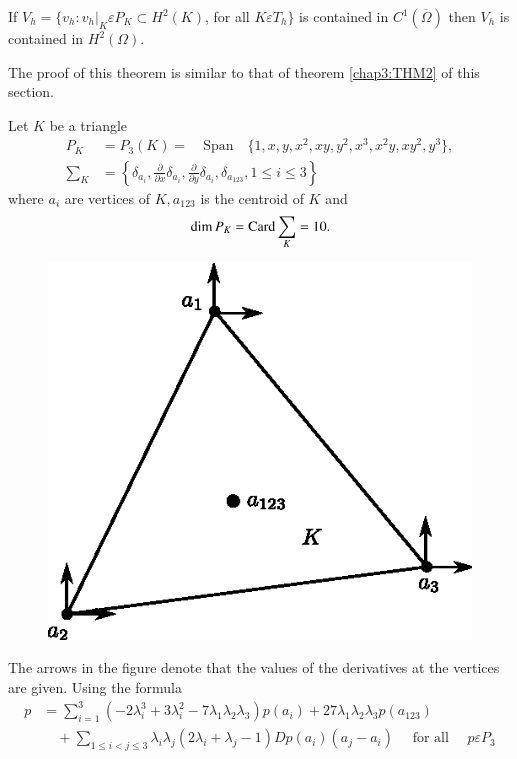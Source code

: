 \begin{THM}\label{chap3:THM3}
If $V_h=\{ v_h:v_h|_K\varepsilon P_K\subset H^2(K)$, for all
$K\varepsilon T_h\}$ is contained in $C^1(\overline{\Omega})$ then
$V_h$ is contained in $H^2(\Omega)$. 
\end{THM}

The proof of this theorem is similar to that of theorem
\ref{chap3:THM2} of this section.

\begin{exam}\label{chap3:exm4}
Let $K$ be a triangle 
\begin{align*}
P_K &= P_3(K)=\quad\text{Span}\quad \{ 1,x,y,x^2,xy,y^2,x^3,x^2y,
xy^2, y^3\},\\
\sum_K &= \left\{ \delta_{a_i},\frac{\partial}{\partial x}\delta_{a_i},
\frac{\partial}{\partial y}\delta_{a_i}, \delta_{a_{123}}, 1\leq i\leq 3\right\} 
\end{align*}
where $a_i$ are vertices of $K, a_{123}$ is the centroid of $K$ and 
$$
\dim P_K= \operatorname{Card} \sum_K=10.
$$
\begin{figure}[H]
\centering
\includegraphics{figure/fig3.8.eps}
\caption{}\label{fig3.8}
\end{figure}


The arrows in the figure denote that the values of the derivatives at
the vertices are given. Using the formula
\begin{align*}
p&=\sum\limits_{i=1}^3\left(-2\lambda_i^3 +3\lambda_i^2 -7\lambda_1\lambda_2\lambda_3\right)
p(a_i)+27\lambda_1\lambda_2\lambda_3 p(a_{123})\\
&\quad+\sum\limits_{1\leq
i< j\leq 3}\lambda_i\lambda_j(2 \lambda_i+\lambda_j -1) Dp(a_i)(a_j -a_i)
\quad \text{ for all }  \quad p\varepsilon P_3
\end{align*}
\pageoriginale


\end{exam}
